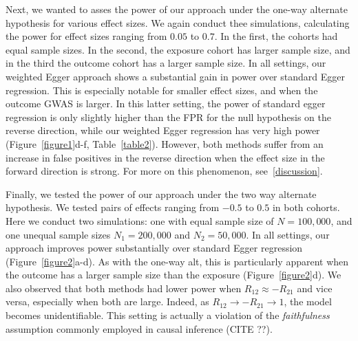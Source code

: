 \documentclass{article}
\begin{document}
Next, we wanted to asses the power of our approach under the one-way alternate
hypothesis for various effect sizes. We again conduct thee simulations,
calculating the power for effect sizes ranging from $0.05$ to $0.7$.
In the first, the cohorts had equal sample sizes. In the second, the exposure
cohort has larger sample size, and in the third the outcome cohort
has a larger sample size. In all settings, our weighted Egger approach shows
a substantial gain in power over standard Egger regression. This is especially
notable for smaller effect sizes, and when the outcome GWAS is larger.
In this latter setting, the power of standard egger regression is only slightly
higher than the FPR for the null hypothesis on the reverse direction,
while our weighted Egger regression has very high power
(Figure~\ref{figure1}d-f, Table~\ref{table2}). However, both
methods suffer from an increase in false positives in the reverse direction
when the effect size in the forward direction is strong. For more on this
phenomenon, see~\ref{discussion}.


Finally, we tested the power of our approach under the two way alternate
hypothesis. We tested pairs of effects ranging from $-0.5$ to $0.5$ in both cohorts.
Here we conduct two simulations: one with equal sample size of $N=100,000$,
and one unequal sample sizes $N_1 = 200,000$ and $N_2 = 50,000$.
In all settings, our approach improves power
substantially over standard Egger regression (Figure~\ref{figure2}a-d). As with
the one-way alt, this is particularly apparent when the outcome has a larger
sample size than the exposure (Figure~\ref{figure2}d). We also observed that both
methods had lower power when $R_{12} \approx -R_{21}$ and vice versa, especially when
both are large. Indeed, as $R_{12} \rightarrow -R_{21} \rightarrow 1$, the model
becomes unidentifiable. This setting is actually a violation of the \emph{faithfulness}
assumption commonly employed in causal inference (CITE ??).
\end{document}
